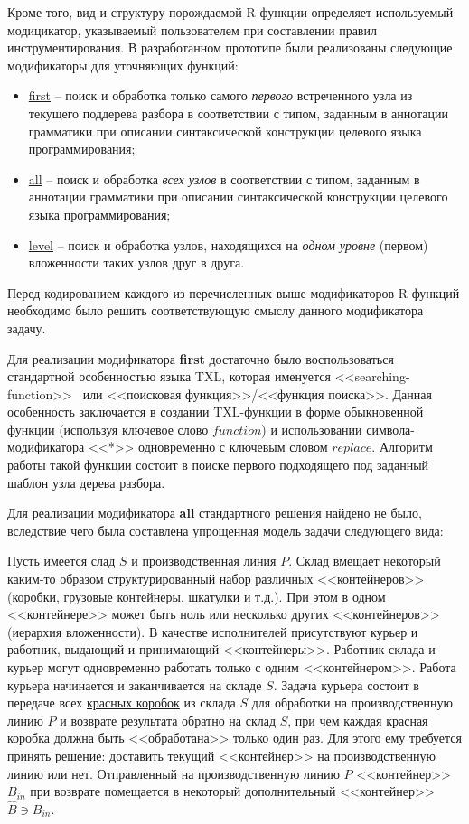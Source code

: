 Кроме того, вид и структуру порождаемой R-функции определяет используемый модицикатор, указываемый пользователем при составлении правил инструментирования.
В разработанном прототипе были реализованы следующие модификаторы для уточняющих функций:

\begin{itemize}[noitemsep]
  \item \underline{first} -- поиск и обработка только самого \textit{первого} встреченного узла из текущего поддерева разбора в соответствии с типом, заданным в аннотации грамматики при описании синтаксической конструкции целевого языка программирования;
  \item \underline{all}   -- поиск и обработка \textit{всех узлов} в соответствии с типом, заданным в аннотации грамматики при описании синтаксической конструкции целевого языка программирования;
  \item \underline{level} -- поиск и обработка узлов, находящихся на \textit{одном уровне} (первом) вложенности таких узлов друг в друга.
\end{itemize}

Перед кодированием каждого из перечисленных выше модификаторов R-функций необходимо было решить соответствующую смыслу данного модификатора задачу.

Для реализации модификатора \textbf{first} достаточно было воспользоваться стандартной особенностью языка TXL, которая именуется <<searching-function>>~\cite{txl-book} или <<поисковая функция>>/<<функция поиска>>.
Данная особенность заключается в создании TXL-функции в форме обыкновенной функции (используя ключевое слово $function$) и использовании символа-модификатора <<*>> одновременно с ключевым словом $replace$.
Алгоритм работы такой функции состоит в поиске первого подходящего под заданный шаблон узла дерева разбора.

Для реализации модификатора \textbf{all} стандартного решения найдено не было, вследствие чего была составлена упрощенная модель задачи следующего вида:

Пусть имеется слад $S$ и производственная линия $P$.
Склад вмещает некоторый каким-то образом структурированный набор различных <<контейнеров>> (коробки, грузовые контейнеры, шкатулки и т.д.).
При этом в одном <<контейнере>> может быть ноль или несколько других <<контейнеров>> (иерархия вложенности).
В качестве исполнителей присутствуют курьер и работник, выдающий и принимающий <<контейнеры>>.
Работник склада и курьер могут одновременно работать только с одним <<контейнером>>.
Работа курьера начинается и заканчивается на складе $S$.
Задача курьера состоит в передаче всех \underline{красных коробок} из склада $S$ для обработки на производственную линию $P$ и возврате результата обратно на склад $S$, при чем каждая красная коробка должна быть <<обработана>> только один раз.
Для этого ему требуется принять решение: доставить текущий <<контейнер>> на производственную линию или нет.
Отправленный на производственную линию $P$ <<контейнер>> $B_{in}$ при возврате помещается в некоторый дополнительный <<контейнер>> $\hat{B} \ni B_{in}$.

